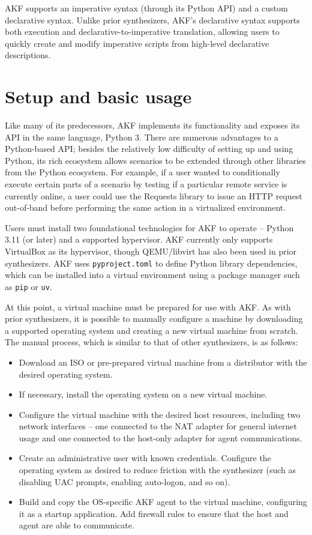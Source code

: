 \documentclass[letterpaper,12pt]{report}
\def\tightlist{}
\newcommand{\passthrough}[1]{#1}
\begin{document}
AKF supports an imperative syntax (through its Python API) and a custom
declarative syntax. Unlike prior synthesizers, AKF's declarative syntax
supports both execution and declarative-to-imperative translation,
allowing users to quickly create and modify imperative scripts from
high-level declarative descriptions.

\section{Setup and basic usage}\label{setup-and-basic-usage}

Like many of its predecessors, AKF implements its functionality and
exposes its API in the same language, Python 3. There are numerous
advantages to a Python-based API; besides the relatively low difficulty
of setting up and using Python, its rich ecosystem allows scenarios to
be extended through other libraries from the Python ecosystem. For
example, if a user wanted to conditionally execute certain parts of a
scenario by testing if a particular remote service is currently online,
a user could use the Requests library \cite{Requests31Documentation}
to issue an HTTP request out-of-band before performing the same action
in a virtualized environment.

Users must install two foundational technologies for AKF to operate --
Python 3.11 (or later) and a supported hypervisor. AKF currently only
supports VirtualBox as its hypervisor, though QEMU/libvirt has also been
used in prior synthesizers. AKF uses
\passthrough{\lstinline!pyproject.toml!} to define Python library
dependencies, which can be installed into a virtual environment using a
package manager such as \passthrough{\lstinline!pip!} or
\passthrough{\lstinline!uv!}.

At this point, a virtual machine must be prepared for use with AKF. As
with prior synthesizers, it is possible to manually configure a machine
by downloading a supported operating system and creating a new virtual
machine from scratch. The manual process, which is similar to that of
other synthesizers, is as follows:

\begin{itemize}
\tightlist
\item
  Download an ISO or pre-prepared virtual machine from a distributor
  with the desired operating system.
\item
  If necessary, install the operating system on a new virtual machine.
\item
  Configure the virtual machine with the desired host resources,
  including two network interfaces -- one connected to the NAT adapter
  for general internet usage and one connected to the host-only adapter
  for agent communications.
\item
  Create an administrative user with known credentials. Configure the
  operating system as desired to reduce friction with the synthesizer
  (such as disabling UAC prompts, enabling auto-logon, and so on).
\item
  Build and copy the OS-specific AKF agent to the virtual machine,
  configuring it as a startup application. Add firewall rules to ensure
  that the host and agent are able to communicate.
\end{itemize}
\end{document}
